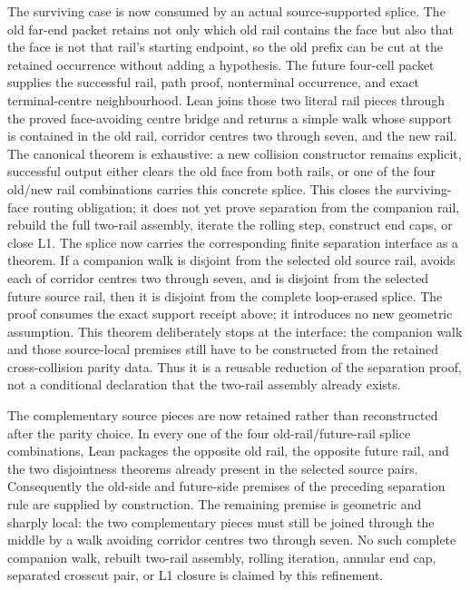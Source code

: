 \documentclass[11pt]{article}
\theoremstyle{definition}
\begin{document}
The surviving case is now consumed by an actual source-supported splice.
The old far-end packet retains not only which old rail contains the face but
also that the face is not that rail's starting endpoint, so the old prefix can
be cut at the retained occurrence without adding a hypothesis.  The future
four-cell packet supplies the successful rail, path proof, nonterminal
occurrence, and exact terminal-centre neighbourhood.  Lean joins those two
literal rail pieces through the proved face-avoiding centre bridge and returns
a simple walk whose support is contained in the old rail, corridor centres two
through seven, and the new rail.  The canonical theorem is exhaustive: a new
collision constructor remains explicit, successful output either clears the
old face from both rails, or one of the four old/new rail combinations carries
this concrete splice.  This closes the surviving-face routing obligation; it
does not yet prove separation from the companion rail, rebuild the full
two-rail assembly, iterate the rolling step, construct end caps, or close L1.
The splice now carries the corresponding finite separation interface as a
theorem.  If a companion walk is disjoint from the selected old source rail,
avoids each of corridor centres two through seven, and is disjoint from the
selected future source rail, then it is disjoint from the complete loop-erased
splice.  The proof consumes the exact support receipt above; it introduces no
new geometric assumption.  This theorem deliberately stops at the interface:
the companion walk and those source-local premises still have to be
constructed from the retained cross-collision parity data.  Thus it is a
reusable reduction of the separation proof, not a conditional declaration
that the two-rail assembly already exists.

The complementary source pieces are now retained rather than reconstructed
after the parity choice.  In every one of the four old-rail/future-rail splice
combinations, Lean packages the opposite old rail, the opposite future rail,
and the two disjointness theorems already present in the selected source
pairs.  Consequently the old-side and future-side premises of the preceding
separation rule are supplied by construction.  The remaining premise is
geometric and sharply local: the two complementary pieces must still be
joined through the middle by a walk avoiding corridor centres two through
seven.  No such complete companion walk, rebuilt two-rail assembly, rolling
iteration, annular end cap, separated crosscut pair, or L1 closure is claimed
by this refinement.
\end{document}
